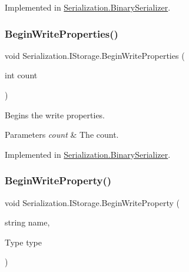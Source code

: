 Implemented in \hyperlink{class_serialization_1_1_binary_serializer_a3853730f36226738133280f47ee43550}{Serialization.\+Binary\+Serializer}.

\mbox{\label{interface_serialization_1_1_i_storage_a4aa8e9eeb65572cabfd1163fd424f447}} 
\subsubsection{\texorpdfstring{Begin\+Write\+Properties()}{BeginWriteProperties()}}
{\footnotesize\ttfamily void Serialization.\+I\+Storage.\+Begin\+Write\+Properties (\begin{DoxyParamCaption}\item[{int}]{count }\end{DoxyParamCaption})}



Begins the write properties. 


\begin{DoxyParams}{Parameters}
{\em count} & The count.\\
\hline
\end{DoxyParams}


Implemented in \hyperlink{class_serialization_1_1_binary_serializer_a021a50d6702e32e15c197783a0bad05a}{Serialization.\+Binary\+Serializer}.

\mbox{\label{interface_serialization_1_1_i_storage_a0b810350295c5e78aca277ce929aaedd}} 
\subsubsection{\texorpdfstring{Begin\+Write\+Property()}{BeginWriteProperty()}}
{\footnotesize\ttfamily void Serialization.\+I\+Storage.\+Begin\+Write\+Property (\begin{DoxyParamCaption}\item[{string}]{name,  }\item[{Type}]{type }\end{DoxyParamCaption})}




